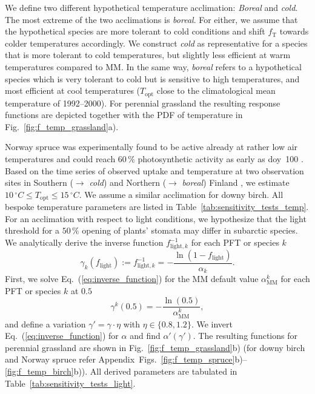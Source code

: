 \documentclass[bg, manuscript]{copernicus}
\begin{document}
We define two different hypothetical temperature acclimation: \emph{Boreal} and \emph{cold}. The most extreme of the two acclimations is \emph{boreal}. For either, we assume that the hypothetical species are more tolerant to cold conditions and shift $f_\mathrm{T}$ towards colder temperatures accordingly. We construct \emph{cold} as representative for a species that is more tolerant to cold temperatures, but slightly less efficient at warm temperatures compared to MM. In the same way, \emph{boreal} refers to a hypothetical species which is very tolerant to cold but is sensitive to high temperatures, and most efficient at cool temperatures ($T_\mathrm{opt}$ close to the climatological mean temperature of 1992--2000). For perennial grassland the resulting response functions are depicted together with the PDF of temperature in Fig.~\ref{fig:f_temp_grassland}a).

Norway spruce was experimentally found to be active already at rather low air temperatures and could reach $60\,\unit{\%}$ photosynthetic activity as early as \unit{doy}~100 \citep{TB:Kolari2007, TP:Wallin2013}. Based on the time series of observed  uptake and temperature at two observation sites in Southern ($\rightarrow$ \emph{cold}) and Northern ($\rightarrow$ \emph{boreal}) Finland \citep{TB:Kolari2007}, we estimate $10\,\unit{^\circ C}\le T_\mathrm{opt} \le 15\,\unit{^\circ C}$. We assume a similar acclimation for downy birch. All bespoke temperature parameters are listed in Table~\ref{tab:sensitivity_tests_temp}.\\

For an acclimation with respect to light conditions, we hypothesize that the light threshold for a $50\,\unit{\%}$ opening of plants' stomata may differ in subarctic species. We analytically derive the inverse function $f_{\mathrm{light},k}^{-1}$ for each PFT or species $k$
\begin{equation}
  \gamma_k(f_\mathrm{light}) := f_{\mathrm{light}, k}^{-1} = -\frac{\ln(1-f_\mathrm{light})}{\alpha_k}.
  \label{eq:inverse_function}
\end{equation}
First, we solve Eq.~(\ref{eq:inverse_function}) for the MM default value $\alpha_\mathrm{MM}^k$ for each PFT or species $k$ at $0.5$ 
\begin{equation}
  \gamma^k(0.5) = -\frac{\ln(0.5)}{\alpha_\mathrm{MM}^k},
  \label{eq:inverse_function_halfway}
\end{equation}
and define a variation $\gamma' = \gamma \cdot \eta$ with $\eta \in \{0.8, 1.2\}$. We invert Eq.~(\ref{eq:inverse_function}) for $\alpha$ and find $\alpha'(\gamma')$. The resulting functions for perennial grassland are shown in Fig.~\ref{fig:f_temp_grassland}b) (for downy birch and Norway spruce refer Appendix~Figs.~\ref{fig:f_temp_spruce}b)--\ref{fig:f_temp_birch}b)). All derived parameters are tabulated in Table~\ref{tab:sensitivity_tests_light}.
\end{document}
